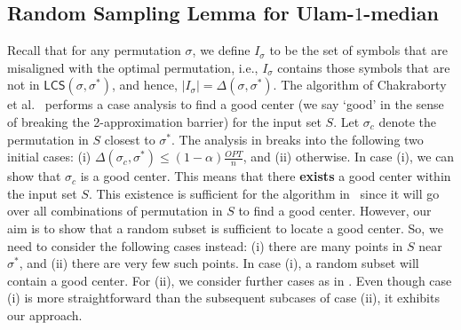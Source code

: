 \documentclass[11pt]{llncs}
\newcommand{\LCS}{{\textsf{LCS}}}
\begin{document}
\subsection{Random Sampling Lemma for Ulam-$1$-median}
Recall that for any permutation $\sigma$, we define $I_{\sigma}$ to be the set of symbols that are misaligned with the optimal permutation, i.e., $I_{\sigma}$ contains those symbols that are not in $\LCS(\sigma,\sigma^{*})$, and hence, $|I_{\sigma}| = \Delta(\sigma, \sigma^*)$.
The algorithm of Chakraborty et al.~\cite{cdk23} performs a case analysis to find a good center (we say `good' in the sense of breaking the 2-approximation barrier) for the input set $S$. 
Let $\sigma_c$ denote the permutation in $S$ closest to $\sigma^*$. 
The analysis in \cite{cdk23} breaks into the following two initial cases: (i) $\Delta(\sigma_c, \sigma^*) \leq (1-\alpha)\frac{OPT}{n}$, and (ii) otherwise. In case (i), we can show that $\sigma_c$ is a good center. This means that there {\bf exists} a good center within the input set $S$. 
This existence is sufficient for the algorithm in~\cite{cdk23} since it will go over all combinations of permutation in $S$ to find a good center. However, our aim is to show that a random subset is sufficient to locate a good center. So, we need to consider the following cases instead: (i) there are many points in $S$ near $\sigma^*$, and (ii) there are very few such points. In case (i), a random subset will contain a good center. For (ii), we consider further cases as in \cite{cdk23}. 
Even though case (i) is more straightforward than the subsequent subcases of case (ii), it exhibits our approach.
\end{document}
